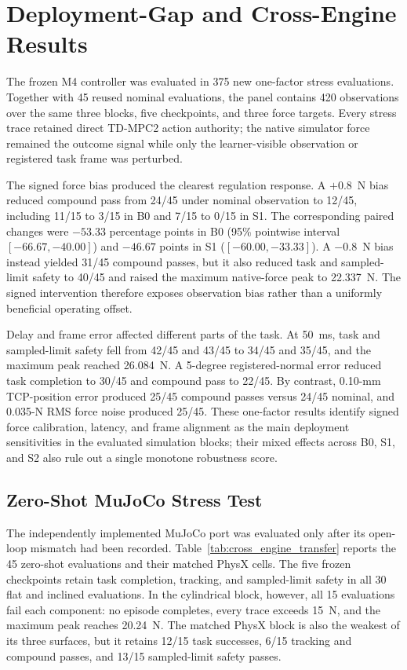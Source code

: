 \section{Deployment-Gap and Cross-Engine Results}
\label{sec:deployment_gap_results}

The frozen M4 controller was evaluated in 375 new one-factor stress
evaluations.  Together with 45 reused nominal evaluations, the panel contains
420 observations over the same three blocks, five checkpoints, and three
force targets.  Every stress trace retained direct TD-MPC2 action authority;
the native simulator force remained the outcome signal while only the
learner-visible observation or registered task frame was perturbed.



The signed force bias produced the clearest regulation response.  A
$+0.8$~N bias reduced compound pass from 24/45 under nominal observation to
12/45, including 11/15 to 3/15 in B0 and 7/15 to 0/15 in S1.  The corresponding
paired changes were $-53.33$ percentage points in B0 (95\% pointwise interval
$[-66.67,-40.00]$) and $-46.67$ points in S1 ($[-60.00,-33.33]$).  A
$-0.8$~N bias instead yielded 31/45 compound passes, but it also reduced task
and sampled-limit safety to 40/45 and raised the maximum native-force peak to
22.337~N.  The signed intervention therefore exposes observation bias rather
than a uniformly beneficial operating offset.

Delay and frame error affected different parts of the task.  At 50~ms,
task and sampled-limit safety fell from 42/45 and 43/45 to 34/45 and 35/45,
and the maximum peak reached 26.084~N.  A 5-degree registered-normal error
reduced task completion to 30/45 and compound pass to 22/45.  By contrast,
0.10-mm TCP-position error produced 25/45 compound passes versus 24/45
nominal, and 0.035-N RMS force noise produced 25/45.  These one-factor results
identify signed force calibration, latency, and frame alignment as the main
deployment sensitivities in the evaluated simulation blocks; their mixed
effects across B0, S1, and S2 also rule out a single monotone robustness score.

\subsection{Zero-Shot MuJoCo Stress Test}

The independently implemented MuJoCo port was evaluated only after its
open-loop mismatch had been recorded. Table~\ref{tab:cross_engine_transfer}
reports the 45 zero-shot evaluations and their matched PhysX cells. The five
frozen checkpoints retain task completion, tracking, and sampled-limit safety
in all 30 flat and inclined evaluations. In the cylindrical block, however,
all 15 evaluations fail each component: no episode completes, every trace
exceeds 15~N, and the maximum peak reaches 20.24~N. The matched PhysX block
is also the weakest of its three surfaces, but it retains 12/15 task
successes, 6/15 tracking and compound passes, and 13/15 sampled-limit safety
passes.


